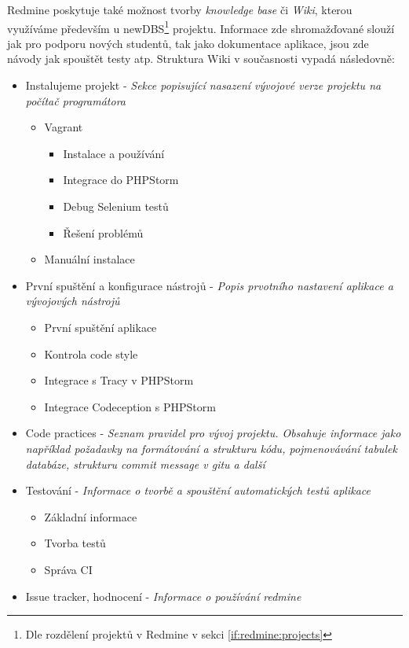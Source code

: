 Redmine poskytuje také možnost tvorby \emph{knowledge base} či \emph{Wiki}, kterou využíváme především u newDBS\footnote{Dle rozdělení projektů v Redmine v sekci \ref{if:redmine:projects}} projektu. Informace zde shromažďované slouží jak pro podporu nových studentů, tak jako dokumentace aplikace, jsou zde návody jak spouštět testy atp. Struktura Wiki v současnosti vypadá následovně:
\begin{itemize}
	\item Instalujeme projekt - \emph{Sekce popisující nasazení vývojové verze projektu na počítač programátora}
	\begin{itemize}
		\item Vagrant
		\begin{itemize}
			\item Instalace a používání
			\item Integrace do PHPStorm
			\item Debug Selenium testů
			\item Řešení problémů
		\end{itemize}
		\item Manuální instalace
	\end{itemize}
	\item První spuštění a konfigurace nástrojů - \emph{Popis prvotního nastavení aplikace a vývojových nástrojů}
	\begin{itemize}
		\item První spuštění aplikace
		\item Kontrola code style
		\item Integrace s Tracy v PHPStorm
		\item Integrace Codeception s PHPStorm
	\end{itemize}
	\item Code practices - \emph{Seznam pravidel pro vývoj projektu. Obsahuje informace jako například požadavky na formátování a strukturu kódu, pojmenovávání tabulek databáze, strukturu commit message v gitu a další}
	\item Testování - \emph{Informace o tvorbě a spouštění automatických testů aplikace}
	\begin{itemize}
		\item Základní informace
		\item Tvorba testů
		\item Správa CI
	\end{itemize}
	\item Issue tracker, hodnocení - \emph{Informace o používání redmine}
	\begin{itemize}

\end{itemize}
\end{itemize}
